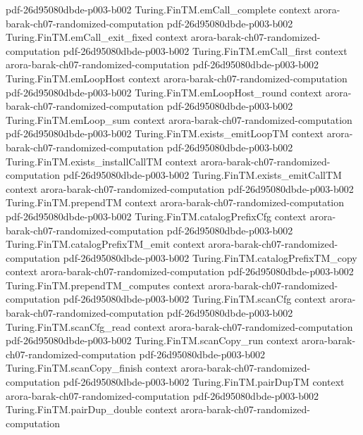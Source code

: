 \begin{theorem}
  {pdf-26d95080dbde-p003-b002}
\proofstep
  {Turing.FinTM.emCall_complete}
  {context}
  {arora-barak-ch07-randomized-computation}
  {pdf-26d95080dbde-p003-b002}
\proofstep
  {Turing.FinTM.emCall_exit_fixed}
  {context}
  {arora-barak-ch07-randomized-computation}
  {pdf-26d95080dbde-p003-b002}
\proofstep
  {Turing.FinTM.emCall_first}
  {context}
  {arora-barak-ch07-randomized-computation}
  {pdf-26d95080dbde-p003-b002}
\proofstep
  {Turing.FinTM.emLoopHost}
  {context}
  {arora-barak-ch07-randomized-computation}
  {pdf-26d95080dbde-p003-b002}
\proofstep
  {Turing.FinTM.emLoopHost_round}
  {context}
  {arora-barak-ch07-randomized-computation}
  {pdf-26d95080dbde-p003-b002}
\proofstep
  {Turing.FinTM.emLoop_sum}
  {context}
  {arora-barak-ch07-randomized-computation}
  {pdf-26d95080dbde-p003-b002}
\proofstep
  {Turing.FinTM.exists_emitLoopTM}
  {context}
  {arora-barak-ch07-randomized-computation}
  {pdf-26d95080dbde-p003-b002}
\proofstep
  {Turing.FinTM.exists_installCallTM}
  {context}
  {arora-barak-ch07-randomized-computation}
  {pdf-26d95080dbde-p003-b002}
\proofstep
  {Turing.FinTM.exists_emitCallTM}
  {context}
  {arora-barak-ch07-randomized-computation}
  {pdf-26d95080dbde-p003-b002}
\proofstep
  {Turing.FinTM.prependTM}
  {context}
  {arora-barak-ch07-randomized-computation}
  {pdf-26d95080dbde-p003-b002}
\proofstep
  {Turing.FinTM.catalogPrefixCfg}
  {context}
  {arora-barak-ch07-randomized-computation}
  {pdf-26d95080dbde-p003-b002}
\proofstep
  {Turing.FinTM.catalogPrefixTM_emit}
  {context}
  {arora-barak-ch07-randomized-computation}
  {pdf-26d95080dbde-p003-b002}
\proofstep
  {Turing.FinTM.catalogPrefixTM_copy}
  {context}
  {arora-barak-ch07-randomized-computation}
  {pdf-26d95080dbde-p003-b002}
\proofstep
  {Turing.FinTM.prependTM_computes}
  {context}
  {arora-barak-ch07-randomized-computation}
  {pdf-26d95080dbde-p003-b002}
\proofstep
  {Turing.FinTM.scanCfg}
  {context}
  {arora-barak-ch07-randomized-computation}
  {pdf-26d95080dbde-p003-b002}
\proofstep
  {Turing.FinTM.scanCfg_read}
  {context}
  {arora-barak-ch07-randomized-computation}
  {pdf-26d95080dbde-p003-b002}
\proofstep
  {Turing.FinTM.scanCopy_run}
  {context}
  {arora-barak-ch07-randomized-computation}
  {pdf-26d95080dbde-p003-b002}
\proofstep
  {Turing.FinTM.scanCopy_finish}
  {context}
  {arora-barak-ch07-randomized-computation}
  {pdf-26d95080dbde-p003-b002}
\proofstep
  {Turing.FinTM.pairDupTM}
  {context}
  {arora-barak-ch07-randomized-computation}
  {pdf-26d95080dbde-p003-b002}
\proofstep
  {Turing.FinTM.pairDup_double}
  {context}
  {arora-barak-ch07-randomized-computation}

\end{theorem}
